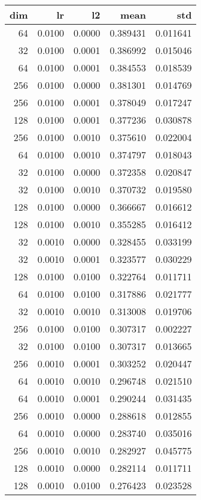 \begin{tabular}{rrrrr}
\toprule
 dim &      lr &      l2 &      mean &       std \\
\midrule
  64 &  0.0100 &  0.0000 &  0.389431 &  0.011641 \\
  32 &  0.0100 &  0.0001 &  0.386992 &  0.015046 \\
  64 &  0.0100 &  0.0001 &  0.384553 &  0.018539 \\
 256 &  0.0100 &  0.0000 &  0.381301 &  0.014769 \\
 256 &  0.0100 &  0.0001 &  0.378049 &  0.017247 \\
 128 &  0.0100 &  0.0001 &  0.377236 &  0.030878 \\
 256 &  0.0100 &  0.0010 &  0.375610 &  0.022004 \\
  64 &  0.0100 &  0.0010 &  0.374797 &  0.018043 \\
  32 &  0.0100 &  0.0000 &  0.372358 &  0.020847 \\
  32 &  0.0100 &  0.0010 &  0.370732 &  0.019580 \\
 128 &  0.0100 &  0.0000 &  0.366667 &  0.016612 \\
 128 &  0.0100 &  0.0010 &  0.355285 &  0.016412 \\
  32 &  0.0010 &  0.0000 &  0.328455 &  0.033199 \\
  32 &  0.0010 &  0.0001 &  0.323577 &  0.030229 \\
 128 &  0.0100 &  0.0100 &  0.322764 &  0.011711 \\
  64 &  0.0100 &  0.0100 &  0.317886 &  0.021777 \\
  32 &  0.0010 &  0.0010 &  0.313008 &  0.019706 \\
 256 &  0.0100 &  0.0100 &  0.307317 &  0.002227 \\
  32 &  0.0100 &  0.0100 &  0.307317 &  0.013665 \\
 256 &  0.0010 &  0.0001 &  0.303252 &  0.020447 \\
  64 &  0.0010 &  0.0010 &  0.296748 &  0.021510 \\
  64 &  0.0010 &  0.0001 &  0.290244 &  0.031435 \\
 256 &  0.0010 &  0.0000 &  0.288618 &  0.012855 \\
  64 &  0.0010 &  0.0000 &  0.283740 &  0.035016 \\
 256 &  0.0010 &  0.0010 &  0.282927 &  0.045775 \\
 128 &  0.0010 &  0.0000 &  0.282114 &  0.011711 \\
 128 &  0.0010 &  0.0100 &  0.276423 &  0.023528 \\

\end{tabular}
